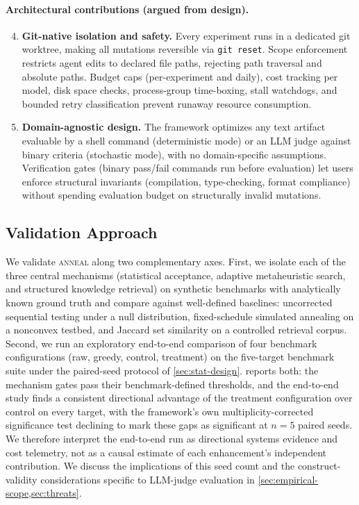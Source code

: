 \paragraph{Architectural contributions (argued from design).}

\begin{enumerate}
  \setcounter{enumi}{3}
  \item \textbf{Git-native isolation and safety.}
    Every experiment runs in a dedicated git worktree, making all mutations reversible via \texttt{git reset}.
    Scope enforcement restricts agent edits to declared file paths, rejecting path traversal and absolute paths.
    Budget caps (per-experiment and daily), cost tracking per model, disk space checks, process-group time-boxing, stall watchdogs, and bounded retry classification prevent runaway resource consumption.

  \item \textbf{Domain-agnostic design.}
    The framework optimizes any text artifact evaluable by a shell command (deterministic mode) or an LLM judge against binary criteria (stochastic mode), with no domain-specific assumptions.
    Verification gates (binary pass/fail commands run before evaluation) let users enforce structural invariants (compilation, type-checking, format compliance) without spending evaluation budget on structurally invalid mutations.
\end{enumerate}

\subsection{Validation Approach}

We validate \textsc{anneal} along two complementary axes.
First, we isolate each of the three central mechanisms (statistical acceptance, adaptive metaheuristic search, and structured knowledge retrieval) on synthetic benchmarks with analytically known ground truth and compare against well-defined baselines: uncorrected sequential testing under a null distribution, fixed-schedule simulated annealing on a nonconvex testbed, and Jaccard set similarity on a controlled retrieval corpus.
Second, we run an exploratory end-to-end comparison of four benchmark configurations (raw, greedy, control, treatment) on the five-target benchmark suite under the paired-seed protocol of \cref{sec:stat-design}.
 reports both: the mechanism gates pass their benchmark-defined thresholds, and the end-to-end study finds a consistent directional advantage of the treatment configuration over control on every target, with the framework's own multiplicity-corrected significance test declining to mark these gaps as significant at $n = 5$ paired seeds.
We therefore interpret the end-to-end run as directional systems evidence and cost telemetry, not as a causal estimate of each enhancement's independent contribution.
We discuss the implications of this seed count and the construct-validity considerations specific to LLM-judge evaluation in \cref{sec:empirical-scope,sec:threats}.

